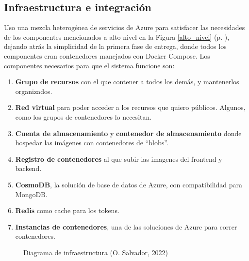 \documentclass[11pt]{article}
\begin{document}
\begin{flushleft}
\clearpage
\section{Infraestructura e integración}
Uso una mezcla heterogénea de servicios de Azure para satisfacer las necesidades de los componentes mencionados a alto nivel en la Figura \ref{alto_nivel} (p. \pageref{alto_nivel}), dejando atrás la simplicidad de la primera fase de entrega, donde todos los componentes eran contenedores manejados con Docker Compose. Los componentes necesarios para que el sistema funcione son:
	\begin{enumerate}
		\itemsep0em 
		\item \textbf{Grupo de recursos} con el que contener a todos los demás, y mantenerlos organizados.
		\item \textbf{Red virtual} para poder acceder a los recursos que quiero públicos. Algunos, como los grupos de contenedores lo necesitan.
		\item \textbf{Cuenta de almacenamiento} y \textbf{contenedor de almacenamiento} donde hospedar las imágenes con contenedores de ``blobs''.
		\item \textbf{Registro de contenedores} al que subir las imagenes del frontend y backend.
		\item \textbf{CosmoDB}, la solución de base de datos de Azure, con compatibilidad para MongoDB.
		\item \textbf{Redis} como cache para los tokens.
		\item \textbf{Instancias de contenedores}, una de las soluciones de Azure para correr contenedores.
	\end{enumerate}

	\begin{figure}[htb]
		\centering
		\caption{Diagrama de infraestructura (O. Salvador, 2022)}
	\end{figure}






\end{flushleft}
\end{document}
